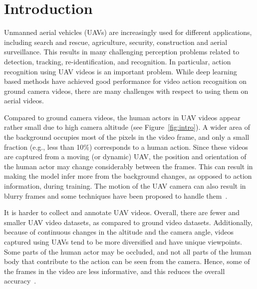 \documentclass[10pt,twocolumn,letterpaper]{article}
\begin{document}
%
 \section{Introduction}
Unmanned aerial vehicles (UAVs) are increasingly used for different applications, including search and rescue, agriculture, security, construction and aerial surveillance.  This results in many challenging perception problems related to detection, tracking, re-identification, and recognition.
In particular, action recognition using UAV videos is an important problem. While deep learning based methods\cite{feichtenhofer2020x3d,carreira2017quo} have achieved good performance for video action recognition on ground camera videos\cite{carreira2017quo,Monfort2020MomentsIT}, there are many challenges with respect to using them on aerial videos. 



Compared to ground camera videos, the human actors in UAV videos appear rather small due to high camera altitude (see Figure~\ref{fig:intro}). A wider area of the background occupies most of the pixels in the video frame, and only a small fraction (e.g., less than 10\%) corresponds to a human action. Since these videos are captured from a moving (or dynamic) UAV, the position and orientation of the human actor may change considerably between the frames. This can result in making the model infer more from the background changes, as opposed to action information, during training. The motion of the UAV camera can also result in blurry frames and some techniques have been proposed to handle them~\cite{li2021uav,zhao2021janusnet,divya2022far}. 




It is harder to collect and annotate UAV videos.  Overall, there are fewer and smaller UAV video datasets, as compared to ground video datasets. 
Additionally, because of continuous changes in the altitude and the camera angle, videos captured using UAVs tend to be more diversified and have unique viewpoints. Some parts of the human actor may be occluded, and not all parts of the human body that contribute to the action can be seen from the camera. Hence, some of the frames in the video are less informative, and this reduces the overall accuracy~\cite{zhi2021mgsampler,Wu2019AdaFrameAF,Ren2020BestFS,Gowda2021SMARTFS}. 
\end{document}
